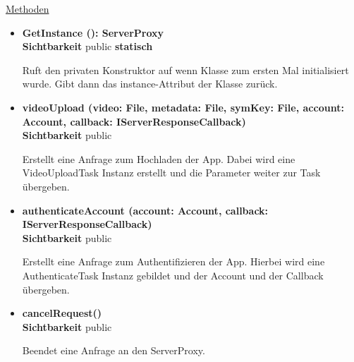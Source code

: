 \underline{Methoden}
\begin{itemize}
\itemsep0pt

\item \textbf{GetInstance (): ServerProxy}\hfill\\
\textbf{Sichtbarkeit} public \newline
\textbf{statisch} 

Ruft den privaten Konstruktor auf wenn Klasse zum ersten Mal initialisiert wurde. Gibt dann das instance-Attribut der Klasse zurück.

\item \textbf{videoUpload (video: File, metadata: File, symKey: File, account: Account, callback: IServerResponseCallback)}\hfill\\
\textbf{Sichtbarkeit} public

Erstellt eine Anfrage zum Hochladen der App. Dabei wird eine VideoUploadTask Instanz erstellt und die Parameter weiter zur  Task übergeben.

\item \textbf{authenticateAccount (account: Account, callback: IServerResponseCallback)}\hfill\\
\textbf{Sichtbarkeit} public

Erstellt eine Anfrage zum Authentifizieren der App. Hierbei wird eine AuthenticateTask Instanz gebildet und der Account und der Callback übergeben.

\item \textbf{cancelRequest()}\hfill\\
\textbf{Sichtbarkeit} public

Beendet eine Anfrage an den ServerProxy.

\end{itemize}